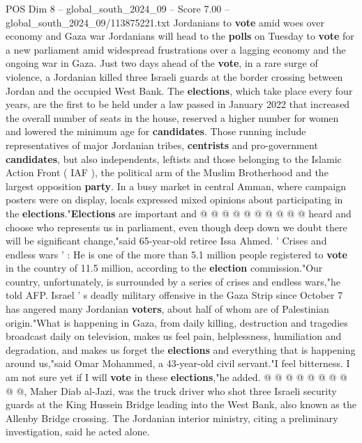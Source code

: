 \begin{textsample}{POS Dim 8 – global\_south\_2024\_09 – Score 7.00 – global\_south\_2024\_09/113875221.txt}  \label{ex:f8_pos_252}
Jordanians to \textbf{vote} amid woes over economy and Gaza war Jordanians will head to the \textbf{polls} on Tuesday to \textbf{vote} for a new parliament amid widespread frustrations over a lagging economy and the ongoing war in Gaza.
Just two days ahead of the \textbf{vote}, in a rare surge of violence, a Jordanian killed three Israeli guards at the border crossing between Jordan and the occupied West Bank.
The \textbf{elections}, which take place every four years, are the first to be held under a law passed in January 2022 that increased the overall number of seats in the house, reserved a higher number for women and lowered the minimum age for \textbf{candidates}.
Those running include representatives of major Jordanian tribes, \textbf{centrists} and pro-government \textbf{candidates}, but also independents, leftists and those belonging to the Islamic Action Front ( IAF ), the political arm of the Muslim Brotherhood and the largest opposition \textbf{party}.
In a busy market in central Amman, where campaign posters were on display, locals expressed mixed opinions about participating in the \textbf{elections}."\textbf{Elections} are important and @ @ @ @ @ @ @ @ @ @ heard and choose who represents us in parliament, even though deep down we doubt there will be significant change,"said 65-year-old retiree Issa Ahmed. ' Crises and endless wars ' : He is one of the more than 5.1 million people registered to \textbf{vote} in the country of 11.5 million, according to the \textbf{election} commission."Our country, unfortunately, is surrounded by a series of crises and endless wars,"he told AFP.
Israel ' s deadly military offensive in the Gaza Strip since October 7 has angered many Jordanian \textbf{voters}, about half of whom are of Palestinian origin."What is happening in Gaza, from daily killing, destruction and tragedies broadcast daily on television, makes us feel pain, helplessness, humiliation and degradation, and makes us forget the \textbf{elections} and everything that is happening around us,"said Omar Mohammed, a 43-year-old civil servant."I feel bitterness.
I am not sure yet if I will \textbf{vote} in these \textbf{elections},"he added. @ @ @ @ @ @ @ @ @ @, Maher Diab al-Jazi, was the truck driver who shot three Israeli security guards at the King Hussein Bridge leading into the West Bank, also known as the Allenby Bridge crossing.
The Jordanian interior ministry, citing a preliminary investigation, said he acted alone.

\end{textsample}
